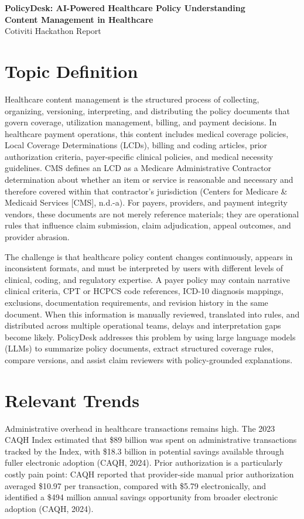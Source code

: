 \documentclass[11pt]{article}
\begin{document}
\begin{center}
    \textbf{\Large PolicyDesk: AI-Powered Healthcare Policy Understanding}\\
    \vspace{0.25em}
    \textbf{Content Management in Healthcare}\\
    \vspace{0.25em}
    Cotiviti Hackathon Report
\end{center}
\section*{Topic Definition}
Healthcare content management is the structured process of collecting, organizing, versioning, interpreting, and distributing the policy documents that govern coverage, utilization management, billing, and payment decisions. In healthcare payment operations, this content includes medical coverage policies, Local Coverage Determinations (LCDs), billing and coding articles, prior authorization criteria, payer-specific clinical policies, and medical necessity guidelines. CMS defines an LCD as a Medicare Administrative Contractor determination about whether an item or service is reasonable and necessary and therefore covered within that contractor's jurisdiction (Centers for Medicare \& Medicaid Services [CMS], n.d.-a). For payers, providers, and payment integrity vendors, these documents are not merely reference materials; they are operational rules that influence claim submission, claim adjudication, appeal outcomes, and provider abrasion.

The challenge is that healthcare policy content changes continuously, appears in inconsistent formats, and must be interpreted by users with different levels of clinical, coding, and regulatory expertise. A payer policy may contain narrative clinical criteria, CPT or HCPCS code references, ICD-10 diagnosis mappings, exclusions, documentation requirements, and revision history in the same document. When this information is manually reviewed, translated into rules, and distributed across multiple operational teams, delays and interpretation gaps become likely. PolicyDesk addresses this problem by using large language models (LLMs) to summarize policy documents, extract structured coverage rules, compare versions, and assist claim reviewers with policy-grounded explanations.

\section*{Relevant Trends}
Administrative overhead in healthcare transactions remains high. The 2023 CAQH Index estimated that \$89 billion was spent on administrative transactions tracked by the Index, with \$18.3 billion in potential savings available through fuller electronic adoption (CAQH, 2024). Prior authorization is a particularly costly pain point: CAQH reported that provider-side manual prior authorization averaged \$10.97 per transaction, compared with \$5.79 electronically, and identified a \$494 million annual savings opportunity from broader electronic adoption (CAQH, 2024).
\end{document}
